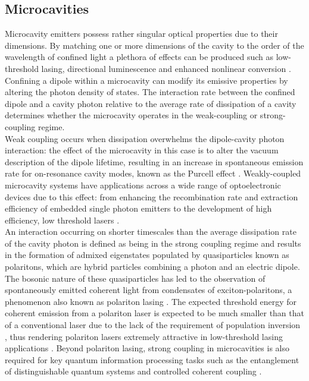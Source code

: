 \subsection{Microcavities}
\label{cavity section}
Microcavity emitters possess rather singular optical properties due to their dimensions. By matching one or more dimensions of the cavity to the order of the wavelength of confined light a plethora of effects can be produced such as low-threshold lasing, directional luminescence and enhanced nonlinear conversion \cite{Christopoulos2007}. Confining a dipole within a microcavity can modify its emissive properties by altering the photon density of states. The interaction rate between the confined dipole and a cavity photon relative to the average rate of dissipation of a cavity determines whether the microcavity operates in the weak-coupling or strong-coupling regime.\\Weak coupling occurs when dissipation overwhelms the dipole-cavity photon interaction: the effect of the microcavity in this case is to alter the vacuum description of the dipole lifetime, resulting in an increase in spontaneous emission rate for on-resonance cavity modes, known as the Purcell effect \cite{Vahala2003}. Weakly-coupled microcavity systems have applications across a wide range of optoelectronic devices due to this effect: from enhancing the recombination rate and extraction efficiency of embedded single photon emitters \cite{Jarjour2007a} to the development of high efficiency, low threshold lasers \cite{Aharonovich2013}.\\An interaction occurring on shorter timescales than the average dissipation rate of the cavity photon is defined as being in the strong coupling regime and results in the formation of admixed eigenstates populated by quasiparticles known as polaritons, which are hybrid particles combining a photon and an electric dipole. The bosonic nature of these quasiparticles has led to the observation of spontaneously emitted coherent light from condensates of exciton-polaritons,  a phenomenon also known as polariton lasing \cite{Malpuech2002}. The expected threshold energy for coherent emission from a polariton laser is expected to be much smaller than that of a conventional laser due to the lack of the requirement of population inversion , thus rendering polariton lasers extremely attractive in low-threshold lasing applications \cite{Christopoulos2007}. Beyond polariton lasing, strong coupling in microcavities is also required for key quantum information processing tasks such as the entanglement of distinguishable quantum systems and controlled coherent coupling \cite{Imamoglu1999,Hennessy2007}.


